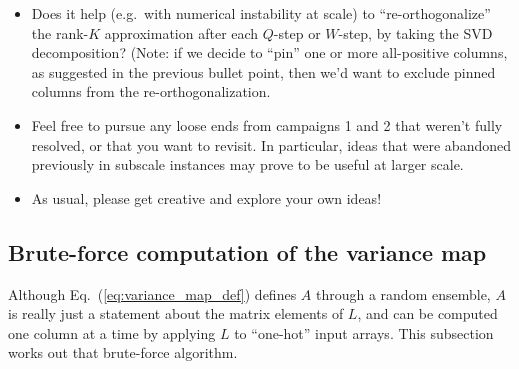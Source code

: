 \documentclass{article}
\numberwithin{equation}{section}   %
\begin{document}
\begin{itemize}
 {\em What it does not fix.} It does not prevent the product $W q_\beta$ from going negative in
 channels where $\bar A_{\beta F} = 0$ -- that is what constraining every channel is for -- it
 only makes such a case repairable. And it does not address the solver's rank-dependent failures
 at $K \ge 128$, which are a conditioning problem, not a feasibility one. It is complementary to
 both: a certified feasible point is exactly what one would hand the solver as a warm start.

 {\em The measurement.} Compare the current recipe at rank $K$ against the pinned variant at the
 same rank $K$ (so $K-1$ learned columns plus one pinned), on at least one subbanded and one
 unsubbanded map, reporting $D$ and the LP failure counts. The interesting question is whether
 the pinned column costs a full unit of rank or a fraction of one: the leading SVD mode is
 already approximately the mean spectrum, so a pinned envelope may be largely reconstructing
 something the truncation would have spent a mode on anyway.

\item Does it help (e.g.\ with numerical instability at scale) to ``re-orthogonalize'' the
 rank-$K$ approximation after each $Q$-step or $W$-step, by taking the SVD decomposition? 
 (Note: if we decide to ``pin'' one or more all-positive columns, as suggested in the previous
 bullet point, then we'd want to exclude pinned columns from the re-orthogonalization.

\item Feel free to pursue any loose ends from campaigns 1 and 2 that weren't fully resolved,
 or that you want to revisit. 
 In particular, ideas that were abandoned previously in subscale instances may prove
 to be useful at larger scale.

\item
As usual, please get creative and explore your own ideas!

\end{itemize}

\subsection{Brute-force computation of the variance map}
\label{ssec:variance_map_bruteforce}

Although Eq.\ (\ref{eq:variance_map_def}) defines $A$ through a random ensemble, $A$ is really just
a statement about the matrix elements of $L$, and can be computed one column at a time by applying
$L$ to ``one-hot'' input arrays. This subsection works out that brute-force algorithm.
\end{document}
